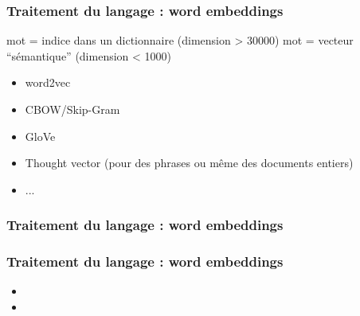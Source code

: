 \documentclass{formation}
\begin{document}
\begin{frame}
  \frametitle{Traitement du langage : word embeddings} 
  mot = indice dans un dictionnaire (dimension > 30000)
  \newline
  mot = vecteur ``sémantique'' (dimension < 1000) 
  \begin{itemize}
  \item word2vec
  \item CBOW/Skip-Gram
  \item GloVe
  \item Thought vector (pour des phrases ou même des documents entiers)
  \item ...
  \end{itemize}
\end{frame}

\begin{frame}
  \frametitle{Traitement du langage : word embeddings} 
\end{frame}

\begin{frame}
  \frametitle{Traitement du langage : word embeddings} 
  \begin{itemize}
    \item {}
    \item {}
  \end{itemize}
\end{frame}
\end{document}
